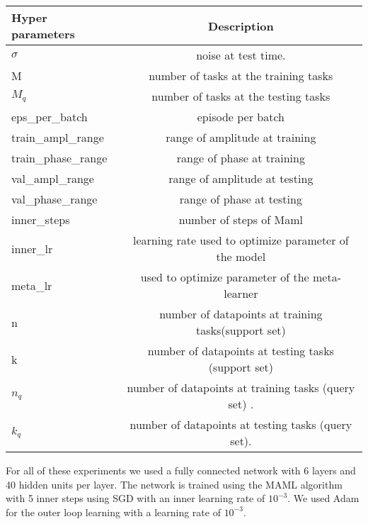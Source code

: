 \begin{table}[H]
    \centering
    \begin{tabular}{l|c}
    Hyper parameters & Description \\
    \hline
    $\sigma$ & noise at test time.\\
    M & number of tasks at the training tasks\\
    $M_q$     & number of tasks at the testing tasks \\
    eps\_per\_batch & episode per batch          \\
    train\_ampl\_range &    range of amplitude at training          \\
    train\_phase\_range &  range of phase at training \\
    val\_ampl\_range &  range of amplitude  at testing \\
    val\_phase\_range & range of phase at testing\\
    inner\_steps &  number of steps of Maml  \\
    inner\_lr &  learning rate used to optimize parameter of the model \\
    meta\_lr & used to optimize parameter of the meta-learner \\
    n & number of datapoints at training tasks(support set) \\
    k & number of datapoints at testing  tasks (support set)\\

    $n_q$ &  number of datapoints at training  tasks (query set)  .\\
    $k_q$ & number of datapoints at testing  tasks (query set).\\
    
    \end{tabular}
\end{table}


For all of these experiments we used a fully connected network with 6 layers and 40 hidden units per layer. The network is trained using the MAML algorithm \citep{finn2017model} with 5 inner steps using SGD with an inner learning rate of $10^{-3}$. We used Adam for the outer loop learning with a learning rate of $10^{-3}$.


